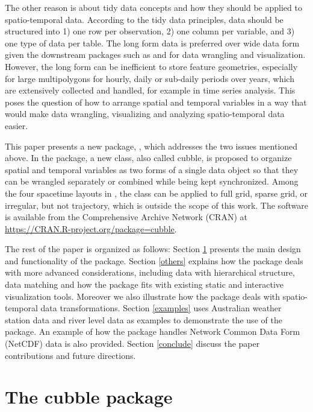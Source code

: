 \documentclass[
  shortnames]{jss}
\begin{document}
The other reason is about tidy data concepts \citep{tidydata} and how they should be applied to spatio-temporal data. According to the tidy data principles, data should be structured into 1) one row per observation, 2) one column per variable, and 3) one type of data per table. The long form data is preferred over wide data form given the downstream packages such as  \citep{dplyr} and  \citep{ggplot2} for data wrangling and visualization. However, the long form can be inefficient to store feature geometries, especially for large multipolygons for hourly, daily or sub-daily periods over years, which are extensively collected and handled, for example in time series analysis. This poses the question of how to arrange spatial and temporal variables in a way that would make data wrangling, visualizing and analyzing spatio-temporal data easier.

This paper presents a new  package, , which addresses the two issues mentioned above. In the package, a new class, also called cubble, is proposed to organize spatial and temporal variables as two forms of a single data object so that they can be wrangled separately or combined while being kept synchronized. Among the four spacetime layouts in \citet{spacetime}, the  class can be applied to full grid, sparse grid, or irregular, but not trajectory, which is outside the scope of this work. The software is available from the Comprehensive  Archive Network (CRAN) at \url{https://CRAN.R-project.org/package=cubble}.

The rest of the paper is organized as follows: Section \ref{cubble} presents the main design and functionality of the  package. Section \ref{others} explains how the  package deals with more advanced considerations, including data with hierarchical structure, data matching and how the package fits with existing static and interactive visualization tools. Moreover we also illustrate how the  package deals with spatio-temporal data transformations. Section \ref{examples} uses Australian weather station data and river level data as examples to demonstrate the use of the package. An example of how the  package handles Network Common Data Form (NetCDF) data is also provided. Section \ref{conclude} discuss the paper contributions and future directions.

\hypertarget{cubble}{%
\section{The cubble package}\label{cubble}}
\end{document}
